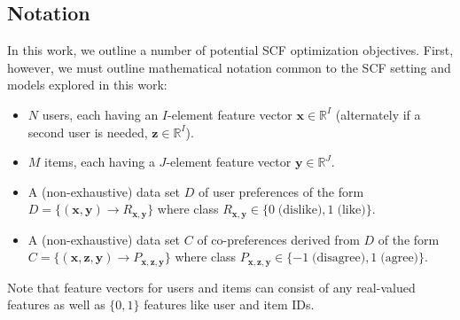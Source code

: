\documentclass[11pt,a4paper]{article}
\newcommand{\R}{\mathbb{R}}
\newcommand{\x}{\vec{x}}
\newcommand{\y}{\vec{y}}
\newcommand{\z}{\vec{z}}
\renewcommand{\vec}[1]{\mathbf{#1}}
\begin{document}
\subsection{Notation}

In this work, we outline a number of potential SCF optimization
objectives.  First, however, we must outline mathematical notation
common to the SCF setting and models explored in this work:
\begin{itemize}
\item $N$ users, each having an $I$-element feature vector 
$\x \in \R^I$ (alternately if a second user is needed, $\z \in \R^I$).
\item $M$ items, each having a $J$-element feature vector 
$\y \in \R^J$.
\item A (non-exhaustive) data set $D$ of user preferences of the form
$D = \{ (\x, \y) \to R_{\x,\y} \}$ where class 
$R_{\x,\y} \in \{ 0 \; \mbox{(dislike)}, 1 \; \mbox{(like)} \}$.
\item A (non-exhaustive) data set $C$ of co-preferences derived from $D$ of the form
$C = \{ (\x, \z, \y) \to P_{\x, \z, \y} \}$ where class 
$P_{\x, \z, \y} \in \{ -1 \; \mbox{(disagree)}, 1 \;\mbox{(agree)} \}$.  
\end{itemize}
Note that feature vectors for users 
and items can consist of any real-valued features as well as $\{0,1\}$
features like user and item IDs.
\end{document}
